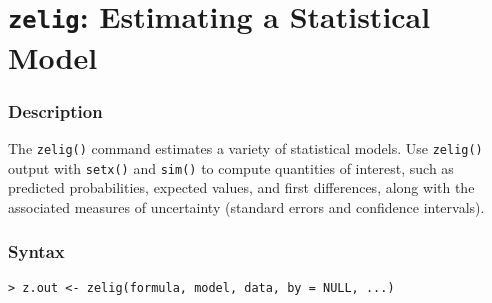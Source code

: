 \section{{\tt zelig}: Estimating a Statistical Model}\label{ss:zelig}

\subsubsection{Description}
The \texttt{zelig()} command estimates a variety of statistical models.  Use
{\tt zelig()} output with {\tt setx()} and {\tt sim()} to compute
quantities of interest, such as predicted probabilities, expected
values, and first differences, along with the associated measures of
uncertainty (standard errors and confidence intervals).

\subsubsection{Syntax}
\begin{verbatim}
> z.out <- zelig(formula, model, data, by = NULL, ...)
\end{verbatim}

